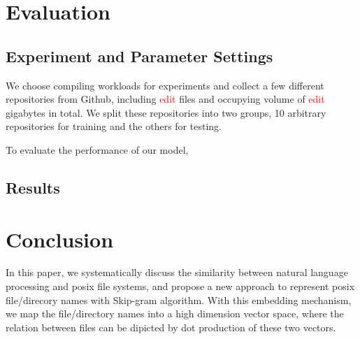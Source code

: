 \documentclass[conference]{IEEEtran}
\begin{document}
\section{Evaluation}
\subsection{Experiment and Parameter Settings}
We choose compiling workloads for experiments and collect a few different repositories from Github,
including \textcolor{red}{edit} files and occupying volume of \textcolor{red}{edit} gigabytes in total.
We split these repositories into two groups, 10 arbitrary repositories for training and the others for testing. 

To evaluate the performance of our model, 


\subsection{Results}






\section{Conclusion}
In this paper, we systematically discuss the similarity between natural language processing and posix file systems,
and propose a new approach to represent posix file/direcory names with Skip-gram algorithm. 
With this embedding mechanism, we map the file/directory names into a high dimension vector space, 
where the relation between files can be dipicted by dot production of these two vectors.  
\end{document}
